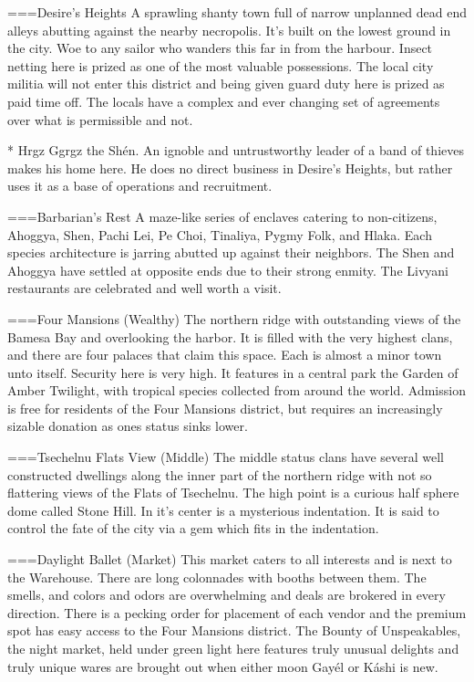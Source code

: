 ===Desire's Heights
A sprawling shanty town full of narrow unplanned dead end alleys abutting against the nearby necropolis. It's built on the lowest ground in the city. Woe to any sailor who wanders this far in from the harbour. Insect netting here is prized as one of the most valuable possessions. The local city militia will not enter this district and being given guard duty here is prized as paid time off. The locals have a complex and ever changing set of agreements over what is permissible and not.

* Hrgz Ggrgz the Shén. An ignoble and untrustworthy leader of a band of thieves makes his home here. He does no direct business in Desire's Heights, but rather uses it as a base of operations and recruitment.

===Barbarian's Rest
A maze-like series of enclaves catering to non-citizens, Ahoggya, Shen, Pachi Lei, Pe Choi, Tinaliya, Pygmy Folk, and Hlaka. Each species architecture is jarring abutted up against their neighbors. The Shen and Ahoggya have settled at opposite ends due to their strong enmity. The Livyani restaurants are celebrated and well worth a visit.

===Four Mansions (Wealthy)
The northern ridge with outstanding views of the Bamesa Bay and overlooking the harbor. It is filled with the very highest clans, and there are four palaces that claim this space. Each is almost a minor town unto itself. Security here is very high. It features in a central park the Garden of Amber Twilight, with tropical species collected from around the world. Admission is free for residents of the Four Mansions district, but requires an increasingly sizable donation as ones status sinks lower. 

===Tsechelnu Flats View (Middle)
The middle status clans have several well constructed dwellings along the inner part of the northern ridge with not so flattering views of the Flats of Tsechelnu. The high point is a curious half sphere dome called Stone Hill. In it's center is a mysterious indentation. It is said to control the fate of the city via a gem which fits in the indentation.
  
===Daylight Ballet (Market)
This market caters to all interests and is next to the Warehouse. There are long colonnades with booths  between them. The smells, and colors and odors are overwhelming and deals are brokered in every direction. There is a pecking order for placement of each vendor and the premium spot has easy access to the Four Mansions district. The Bounty of Unspeakables, the night market, held under green light here features truly unusual delights and truly unique wares are brought out when either moon Gayél or Káshi is new.

